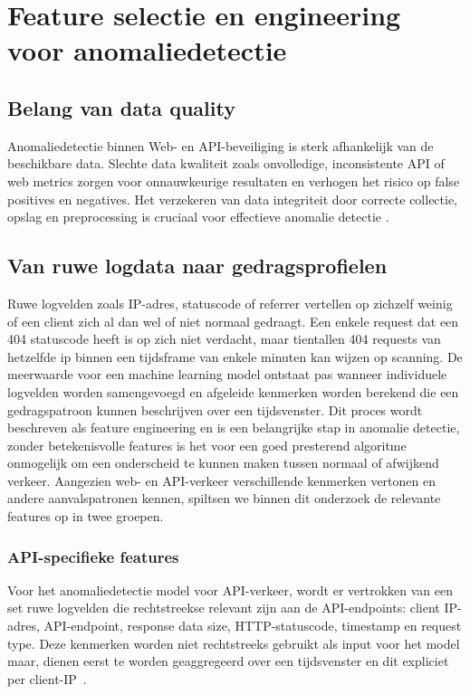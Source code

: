 \section{Feature selectie en engineering voor anomaliedetectie}
\label{sec:ML-methoden-anomalie}
\subsection{Belang van data quality}
\label{subsec:toegevoegde-waarde-ML}
Anomaliedetectie binnen Web- en API-beveiliging is sterk afhankelijk van de beschikbare data. Slechte data kwaliteit zoals onvolledige, inconsistente API of web metrics zorgen voor onnauwkeurige resultaten en verhogen het risico op false positives en negatives. Het verzekeren van data integriteit door correcte collectie, opslag en preprocessing is cruciaal voor effectieve anomalie detectie \Autocite{Meegle2025}.

\subsection{Van ruwe logdata naar gedragsprofielen}
\label{subsec:log-gedrags}
Ruwe logvelden zoals IP-adres, statuscode of referrer vertellen op zichzelf weinig of een client zich al dan wel of niet normaal gedraagt. Een enkele request dat een 404 statuscode heeft is op zich niet verdacht, maar tientallen 404 requests van hetzelfde ip binnen een tijdsframe van enkele minuten kan wijzen op scanning. 
De meerwaarde voor een machine learning model ontstaat pas wanneer individuele logvelden worden samengevoegd en afgeleide kenmerken worden berekend die een gedragspatroon kunnen beschrijven over een tijdsvenster.
Dit proces wordt beschreven als feature engineering en is een belangrijke stap in anomalie detectie, zonder betekenisvolle features is het voor een goed presterend algoritme onmogelijk om een onderscheid te kunnen maken tussen normaal of afwijkend verkeer.%
Aangezien web- en API-verkeer verschillende kenmerken vertonen en andere aanvalspatronen kennen, spiltsen we binnen dit onderzoek de relevante features op in twee groepen. 
\subsubsection{API-specifieke features}
Voor het anomaliedetectie model voor API-verkeer, wordt er vertrokken van een set ruwe logvelden die rechtstreekse relevant zijn aan de API-endpoints: client IP-adres, API-endpoint, response data size, HTTP-statuscode, timestamp en request type. Deze kenmerken worden niet rechtstreeks gebruikt als input voor het model maar, dienen eerst te worden geaggregeerd over een tijdsvenster en dit expliciet per client-IP~\autocite{Sowmya2023}. 

